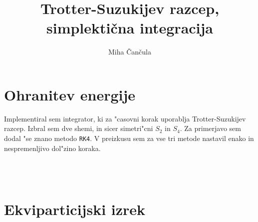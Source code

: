 \documentclass[a4paper,10pt]{article}
\title{Trotter-Suzukijev razcep, simplekti\v cna integracija}
\author{Miha \v Can\v cula}
\begin{document}
\maketitle

\section{Ohranitev energije}

Implementiral sem integrator, ki za "casovni korak uporablja Trotter-Suzukijev razcep. 
Izbral sem dve shemi, in sicer simetri"cni $S_2$ in $S_4$. 
Za primerjavo sem dodal "se znano metodo \texttt{RK4}. 
V preizkusu sem za vse tri metode nastavil enako in nespremenljivo dol"zino koraka. 

 \\
 \\


\section{Ekviparticijski izrek}
\end{document}
